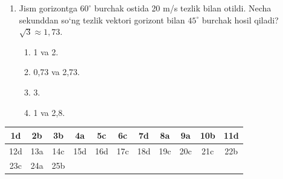 \begin{enumerate}
\item Jism gorizontga $60^\circ$ burchak ostida 20 m/s tezlik bilan otildi. Necha sekunddan so‘ng tezlik vektori gorizont bilan $45^\circ$ burchak hosil qiladi? $\sqrt{3}\approx 1,73$.
\begin{enumerate}[label=\Alph*)]
\item 1 va 2.
\item 0,73 va 2,73.
\item 3.
\item 1 va 2,8.
\end{enumerate}

\end{enumerate}



\begin{table}[!ht]
\centering
\begin{tabular}{|c|c|c|c|c|c|c|c|c|c|c|}
\hline
1d & 2b & 3b & 4a & 5c & 6c & 7d & 8a & 9a & 10b & 11d \\ \hline
12d & 13a & 14c & 15d & 16d & 17c & 18d & 19c & 20c & 21c & 22b \\ \hline
23c & 24a & 25b & & & & & & & & \\ \hline
\end{tabular}
\end{table}